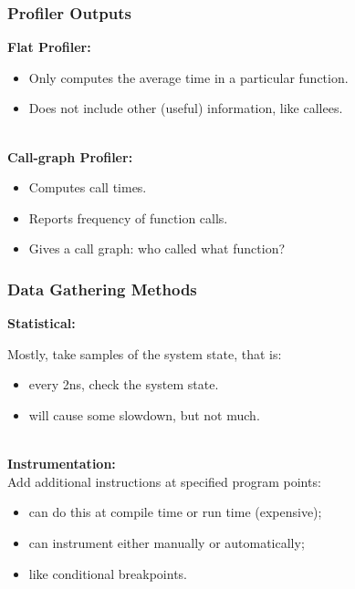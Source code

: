 \documentclass[aspectratio=43]{beamer}
\newenvironment{changemargin}[1]{%
  \begin{list}{}{%
    \setlength{\topsep}{0pt}%
    \setlength{\leftmargin}{#1}%
    \setlength{\rightmargin}{1em}
    \setlength{\listparindent}{\parindent}%
    \setlength{\itemindent}{\parindent}%
    \setlength{\parsep}{\parskip}%
  }%
  \item[]}{\end{list}}
\begin{document}
\begin{frame}
  \frametitle{Profiler Outputs}

  \begin{changemargin}{1.5cm}
  {\bf Flat Profiler:}

  \begin{itemize}
    \item Only computes the average time in a particular function.
    \item Does not include other (useful) information, like callees.
  \end{itemize}

~\\[1em]

  {\bf Call-graph Profiler:}

  \begin{itemize}
    \item Computes call times.
    \item Reports frequency of function calls.
    \item Gives a call graph: who called what function?
  \end{itemize}
  \end{changemargin}
\end{frame}

\begin{frame}
  \frametitle{Data Gathering Methods}

  \begin{changemargin}{2cm}
  {\bf Statistical:}

  Mostly, take samples of the system state, that is:
  \begin{itemize}
    \item every 2ns, check the system state.
    \item will cause some slowdown, but not much.
  \end{itemize}
~\\[1em]

  {\bf Instrumentation:}\\
  Add additional instructions at specified program points:
  \begin{itemize}
    \item can do this at compile time or run time (expensive);
    \item can instrument either manually or automatically;
    \item like conditional breakpoints.
  \end{itemize}
  \end{changemargin}
\end{frame}
\end{document}
